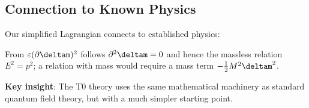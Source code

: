 	\subsection{Connection to Known Physics}
	
	Our simplified Lagrangian connects to established physics:
	
	\begin{table}[htbp]
		\centering
		\caption{Connection to standard field theory}
		\label{tab:standard_connection}
	\end{table}
	From $\varepsilon(\partial\deltam)^2$ follows $\partial^2\deltam = 0$ and hence the massless relation $E^2 = p^2$; a relation with mass would require a mass term $-\tfrac12 M^2\deltam^2$.
	
	\textbf{Key insight}: The T0 theory uses the same mathematical machinery as standard quantum field theory, but with a much simpler starting point.
